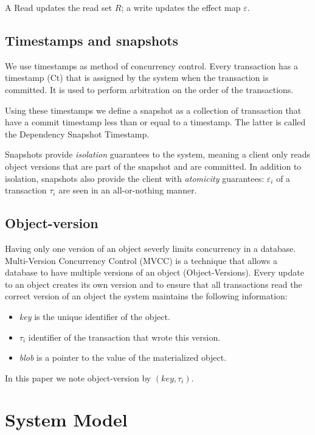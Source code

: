 \documentclass[systeme,french,english]{compas2022}
\begin{document}
A Read updates the read set $R$; a write updates the effect map $\varepsilon$.


\subsection{Timestamps and snapshots}

We use timestamps as method of concurrency control.
Every transaction has a timestamp (Ct) that is assigned by the system when the transaction is committed.
It is used to perform arbitration on the order of the transactions.

Using these timestamps we define a snapshot as a collection of transaction that have a commit timestamp less than or equal to a timestamp.
The latter is called the Dependency Snapshot Timestamp.

Snapshots provide \emph{isolation} guarantees to the system, meaning a client only reads object versions that are part of the snapshot and are committed. 
In addition to isolation, snapshots also provide the client with \emph{atomicity} guarantees: $\varepsilon_i$ of a transaction $\tau_i$ are seen in an all-or-nothing manner.

\subsection{Object-version}

Having only one version of an object severly limits concurrency in a database.
Multi-Version Concurrency Control (MVCC) is a technique that allows a database to have multiple versions of an object (Object-Versions).
Every update to an object creates its own version and to ensure that all transactions read the correct version of an object the system maintains the following information: 
\begin{itemize}
  \item \emph{key} is the unique identifier of the object.
  \item \emph{$\tau_i$} identifier of the transaction that wrote this version.
  \item \emph{blob} is a pointer to the value of the materialized object.
\end{itemize}

In this paper we note object-version by $(key ,\tau_i)$.

\section{System Model}
\end{document}
